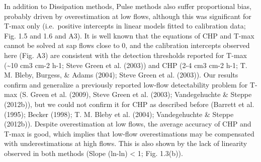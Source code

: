 \documentclass[11pt,twoside]{reedthesis}
\begin{document}
In addition to Dissipation methods, Pulse methods also suffer
proportional bias, probably driven by overestimation at low flows,
although this was significant for T-max only (i.e.~positive intercepts
in linear models fitted to calibration data; Fig. 1.5 and 1.6 and A3).
It is well known that the equations of CHP and T-max cannot be solved at
sap flows close to 0, and the calibration intercepts observed here (Fig.
A3) are consistent with the detection thresholds reported for T-max
(\textasciitilde{}10 cm3 cm-2 h-1; Steve Green et al. (2003)) and CHP
(2-4 cm3 cm-2 h-1; T. M. Bleby, Burgess, \& Adams (2004); Steve Green et
al. (2003)). Our results confirm and generalize a previously reported
low-flow detectability problem for T-max (S. Green et al. (2009), Steve
Green et al. (2003); Vandegehuchte \& Steppe (2012b)), but we could not
confirm it for CHP as described before (Barrett et al. (1995); Becker
(1998); T. M. Bleby et al. (2004); Vandegehuchte \& Steppe (2012b)).
Despite overestimation at low flows, the average accuracy of CHP and
T-max is good, which implies that low-flow overestimations may be
compensated with underestimations at high flows. This is also shown by
the lack of linearity observed in both methods (Slope (ln-ln)
\textless{} 1; Fig. 1.3(b)).\par
\end{document}
